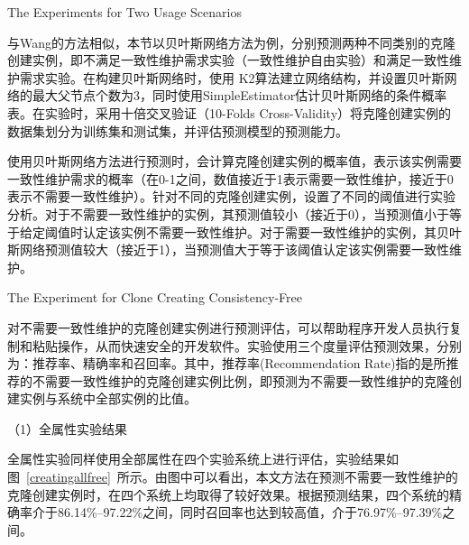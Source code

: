 {The Experiments for Two Usage Scenarios}

与Wang的方法相似，本节以贝叶斯网络方法为例，分别预测两种不同类别的克隆创建实例，即不满足一致性维护需求实验（一致性维护自由实验）和满足一致性维护需求实验。在构建贝叶斯网络时，使用 K2算法建立网络结构，并设置贝叶斯网络的最大父节点个数为3，同时使用SimpleEstimator估计贝叶斯网络的条件概率表。在实验时，采用十倍交叉验证（10-Folds Cross-Validity）将克隆创建实例的数据集划分为训练集和测试集，并评估预测模型的预测能力。

使用贝叶斯网络方法进行预测时，会计算克隆创建实例的概率值，表示该实例需要一致性维护需求的概率（在0-1之间，数值接近于1表示需要一致性维护，接近于0表示不需要一致性维护）。针对不同的克隆创建实例，设置了不同的阈值进行实验分析。对于不需要一致性维护的实例，其预测值较小（接近于0），当预测值小于等于给定阈值时认定该实例不需要一致性维护。对于需要一致性维护的实例，其贝叶斯网络预测值较大（接近于1），当预测值大于等于该阈值认定该实例需要一致性维护。

{The Experiment for Clone Creating Consistency-Free}

对不需要一致性维护的克隆创建实例进行预测评估，可以帮助程序开发人员执行复制和粘贴操作，从而快速安全的开发软件。实验使用三个度量评估预测效果，分别为：推荐率、精确率和召回率。其中，推荐率(Recommendation Rate)指的是所推荐的不需要一致性维护的克隆创建实例比例，即预测为不需要一致性维护的克隆创建实例与系统中全部实例的比值。


（1）全属性实验结果

全属性实验同样使用全部属性在四个实验系统上进行评估，实验结果如图~\ref{creatingallfree}~所示。由图中可以看出，本文方法在预测不需要一致性维护的克隆创建实例时，在四个系统上均取得了较好效果。根据预测结果，四个系统的精确率介于86.14\%--97.22\%之间，同时召回率也达到较高值，介于76.97\%--97.39\%之间。


